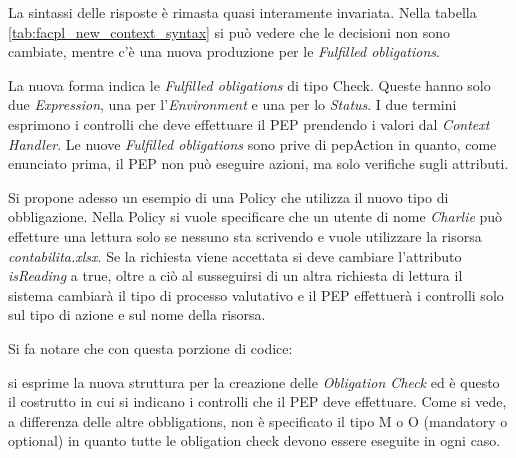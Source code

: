 La sintassi delle risposte è rimasta quasi interamente invariata. Nella tabella \ref{tab:facpl_new_context_syntax}
si può vedere che le decisioni non sono cambiate, mentre c'è una nuova produzione per le \emph{Fulfilled obligations}.

La nuova forma indica le \emph{Fulfilled obligations} di tipo Check. Queste hanno solo due \emph{Expression}, una per
l'\emph{Environment} e una per lo \emph{Status}. I due termini esprimono i controlli che deve effettuare il \ac{PEP}
prendendo i valori dal \emph{Context Handler}. Le nuove \emph{Fulfilled obligations} sono prive di pepAction in quanto,
come enunciato prima, il \ac{PEP} non può eseguire azioni, ma solo verifiche sugli attributi.\par
\vspace{3mm}
Si propone adesso un esempio di una Policy che utilizza il nuovo tipo di obbligazione.
Nella Policy si vuole specificare che un utente di nome \emph{Charlie} può effetture una lettura solo se nessuno sta scrivendo
e vuole utilizzare la risorsa \emph{contabilita.xlsx}.
Se la richiesta viene accettata si deve cambiare l'attributo \emph{isReading} a true, oltre a ciò al susseguirsi
di un altra richiesta di lettura il sistema cambiarà il tipo di processo valutativo e il \ac{PEP} effettuerà i controlli
solo sul tipo di azione e sul nome della risorsa.\par


\vspace{1em}
Si fa notare che con questa porzione di codice:

\vspace{1em}
si esprime la nuova struttura per la creazione delle \emph{Obligation Check} ed è questo il costrutto
in cui si indicano i controlli che il \ac{PEP} deve effettuare. Come si vede, a differenza delle altre
obbligations, non è specificato il tipo M o O (mandatory o optional) in quanto tutte le obligation check
devono essere eseguite in ogni caso.

